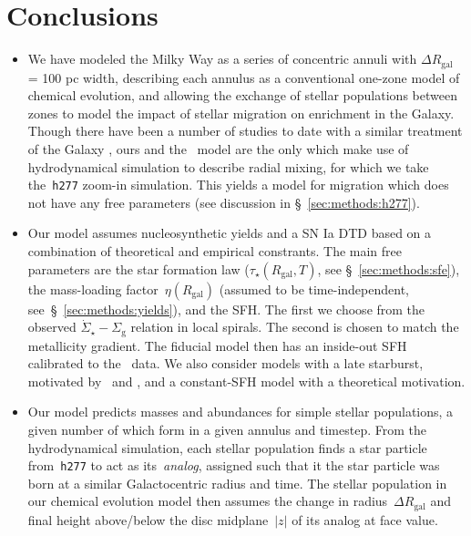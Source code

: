 \documentclass[fleqn, usenatbib]{mnras}
\begin{document}
\section{Conclusions} 
\label{sec:conclusions} 
\begin{itemize} 
	\item We have modeled the Milky Way as a series of concentric annuli with 
	$\Delta R_\text{gal}$ = 100 pc width, describing each annulus as a 
	conventional one-zone model of chemical evolution, and allowing the 
	exchange of stellar populations between zones to model the impact of 
	stellar migration on enrichment in the Galaxy. Though there have been a 
	number of studies to date with a similar treatment of the Galaxy 
	\citep[e.g.][]{Matteucci1989, Schoenrich2009, Nidever2014, Sharma2020}, 
	ours and the~\citet{Minchev2013, Minchev2014, Minchev2017} model are the 
	only which make use of hydrodynamical simulation to describe radial mixing, 
	for which we take the~\texttt{h277} zoom-in simulation. This yields a model 
	for migration which does not have any free parameters (see discussion in 
	\S~\ref{sec:methods:h277}). 

	\item Our model assumes nucleosynthetic yields and a SN Ia DTD based on a 
	combination of theoretical and empirical constrants. The main free 
	parameters are the star formation law ($\tau_\star(R_\text{gal}, T)$, see 
	\S~\ref{sec:methods:sfe}), the mass-loading factor~$\eta(R_\text{gal})$ 
	(assumed to be time-independent, see~\S~\ref{sec:methods:yields}), and the 
	SFH. The first we choose from the observed 
	$\dot{\Sigma}_\star-\Sigma_\text{g}$ relation in local spirals. The second 
	is chosen to match the metallicity gradient. The fiducial model then has an 
	inside-out SFH calibrated to the~\citet{Sanchez2020} data. We also consider 
	models with a late starburst, motivated by~\citet{Mor2019} and 
	\citet{Isern2019}, and a constant-SFH model with a theoretical motivation. 

	\item Our model predicts masses and abundances for simple stellar 
	populations, a given number of which form in a given annulus and timestep. 
	From the hydrodynamical simulation, each stellar population finds a star 
	particle from~\texttt{h277} to act as its~\textit{analog}, assigned such 
	that it the star particle was born at a similar Galactocentric radius and 
	time. The stellar population in our chemical evolution model then assumes 
	the change in radius~$\Delta R_\text{gal}$ and final height above/below the 
	disc midplane~$\left|z\right|$ of its analog at face value. 


\end{itemize}
\end{document}
